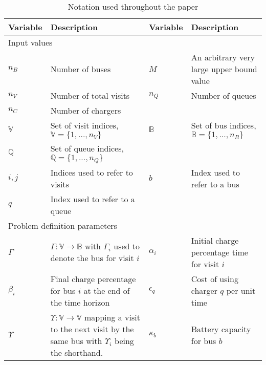 \begin{table}[!t]
	\caption{Notation used throughout the paper}
	\label{tab:variables}
	\centering
	\begin{tabular}{l l l l}
		\toprule
		\textbf{Variable} & \textbf{Description} & \textbf{Variable} & \textbf{Description} \\
		\toprule
		\multicolumn{4}{l}{Input values}                                  \\
			$n_B$         & Number of buses                     &
			$M$           & An arbitrary very large upper bound value \\
			$n_V$           & Number of total visits                    &
			$n_Q$           & Number of queues                        \\
			$n_C$ 			& Number of chargers \\
			$\mathbb{V}$  & Set of visit indices, $\mathbb{V} = \{1, ..., n_V\}$ 			  &
			$\mathbb{B}$  & Set of bus indices, $\mathbb{B} = \{1, ..., n_B\}$ 			 \\
			$\mathbb{Q}$  & Set of queue indices, $\mathbb{Q} = \{1, ..., n_Q\}$ \\
			$i,j$      	& Indices used to refer to visits &
			$b$ 		& Index used to refer to a bus \\
			$q$ 		& Index used to refer to a queue \\
		\hline
		\multicolumn{4}{l}{Problem definition parameters} \\
			$\Gamma$   & $\Gamma: \mathbb{V} \rightarrow \mathbb{B}$ with $\Gamma_i$ used to denote the bus for visit $i$                                   &
			$\alpha_i$   & Initial charge percentage time for visit $i$                       \\
			$\beta_i$    & Final charge percentage for bus $i$ at the end of the time horizon &
			$\epsilon_q$ & Cost of using charger $q$ per unit time                            \\
			$\Upsilon$   & $\Upsilon: \mathbb{V} \rightarrow \mathbb{V}$ mapping a visit to the next visit by the same bus with $\Upsilon_i$ being the shorthand. &
			$\kappa_b$   & Battery capacity for bus $b$                                       \\

\end{tabular}
\end{table}
